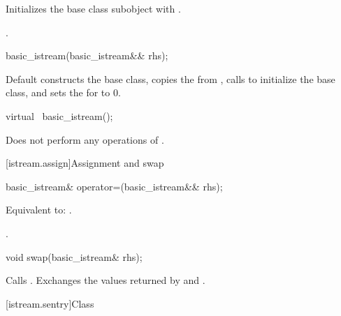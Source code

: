 %
\begin{itemdescr}
\pnum
\effects
Initializes the base class subobject with
.

\pnum
\ensures
{}.
\end{itemdescr}


%
\begin{itemdecl}
basic_istream(basic_istream&& rhs);
\end{itemdecl}

\begin{itemdescr}
\pnum
\effects
Default constructs the base class, copies the
 from , calls
 to initialize the base
class, and sets the  for  to 0.
\end{itemdescr}

%
\begin{itemdecl}
virtual ~basic_istream();
\end{itemdecl}

\begin{itemdescr}
\pnum
\remarks
Does not perform any operations of
.
\end{itemdescr}

[istream.assign]{Assignment and swap}

%
\begin{itemdecl}
basic_istream& operator=(basic_istream&& rhs);
\end{itemdecl}

\begin{itemdescr}
\pnum
\effects
Equivalent to: .

\pnum
\returns
{}.
\end{itemdescr}

%
\begin{itemdecl}
void swap(basic_istream& rhs);
\end{itemdecl}

\begin{itemdescr}
\pnum
\effects
Calls .
Exchanges the values returned by  and
.
\end{itemdescr}

[istream.sentry]{Class }


